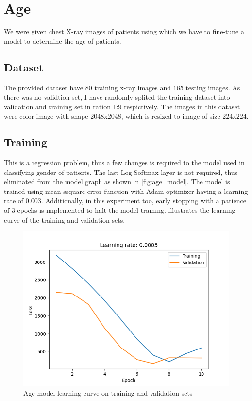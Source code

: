 \section{Age}
\label{sec:warmup4}

    We were given chest X-ray images of patients using which we have to fine-tune a model to determine the age of patients.

\subsection{Dataset}
    The provided dataset have $80$ training x-ray images and $165$ testing images. As there was no validtion set, I have randomly splited the training dataset into validation and training set in ration 1:9 respictively. The images in this dataset were color image with shape $2048$x$2048$, which is resized to image of size $224$x$224$.

\subsection{Training}

    This is a regression problem, thus a few changes is required to the model used in classifying gender of patients. The last Log Softmax layer is not required, thus eliminated from the model graph as shown in \cref{fig:age_model}. The model is trained using mean ssquare error function with Adam optimizer having a learning rate of $0.003$. Additionally, in this experiment too, early stopping with a patience of 3 epochs is implemented to halt the model training.  illustrates the learning curve of the training and validation sets.

    \begin{figure}[htbp]
        \centering
        \includegraphics[width=\linewidth]{../outputs/age/age2/loss-curve.png}
        \caption{Age model learning curve on training and validation sets}
        \label{fig:age-learning-curve}
    \end{figure}

